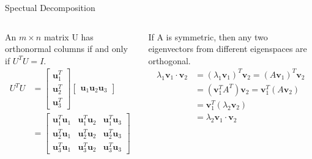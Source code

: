 \documentclass{beamer}
\begin{document}
\begin{frame}{Spectual Decomposition}
{\begin{columns}
    \begin{block}{}
      An $m \times n$ matrix U has orthonormal columns if and only if $U^TU = I$.
      \begin{align*}
        U^TU &=
          \begin{bmatrix}
            \mathbf{u}_1^T \\
            \mathbf{u}_2^T \\
            \mathbf{u}_3^T
          \end{bmatrix}
          \begin{bmatrix} \mathbf{u}_1 \mathbf{u}_2 \mathbf{u}_3 \end{bmatrix} \\
          &= 
          \begin{bmatrix}
            \mathbf{u}_1^T \mathbf{u}_1 & \mathbf{u}_1^T \mathbf{u}_2 & \mathbf{u}_1^T \mathbf{u}_3 \\
            \mathbf{u}_2^T \mathbf{u}_1 & \mathbf{u}_2^T \mathbf{u}_2 & \mathbf{u}_2^T \mathbf{u}_3 \\
            \mathbf{u}_3^T \mathbf{u}_1 & \mathbf{u}_3^T \mathbf{u}_2 & \mathbf{u}_3^T \mathbf{u}_3
          \end{bmatrix}
      \end{align*}
    \end{block}
    \begin{block}{}
      If A is symmetric, then any two eigenvectors from different eigenspaces are orthogonal.
      \begin{align*}
        \lambda_1 \mathbf{v}_1 \cdot \mathbf{v}_2
        &= (\lambda_1 \mathbf{v}_1)^T \mathbf{v}_2 = (A \mathbf{v}_1)^T \mathbf{v}_2 \\
        &= (\mathbf{v}_1^TA^T) \mathbf{v}_2 = \mathbf{v}_1^T (A \mathbf{v}_2) \\
        &= \mathbf{v}_1^T(\lambda_2 \mathbf{v}_2) \\
        &= \lambda_2 \mathbf{v}_1 \cdot \mathbf{v}_2
      \end{align*}
    \end{block}
    \end{columns}
  }%
\end{frame}
\end{document}
